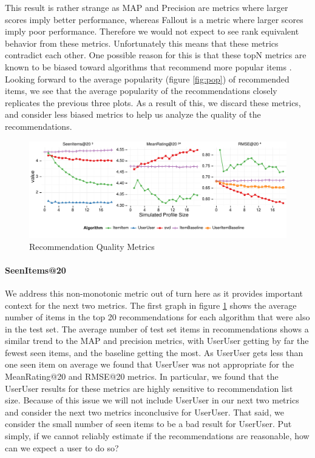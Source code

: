 \documentclass[letterpaper]{sig-alternate}
\begin{document}
  This result is rather strange as MAP and Precision are metrics where larger scores imply better performance, whereas Fallout is a metric where larger scores imply poor performance.
  Therefore we would not expect to see rank equivalent behavior from these metrics.
  Unfortunately this means that these metrics contradict each other.
  One possible reason for this is that these topN metrics are known to be biased toward algorithms that recommend more popular items \cite{bellogin}.
  Looking forward to the average popularity (figure \ref{fig:pop}) of recommended items, we see that the average popularity of the recommendations closely replicates the previous three plots.
  As a result of this, we discard these metrics, and consider less biased metrics to help us analyze the quality of the recommendations.


\begin{figure}[ht!]
  \centering
  \includegraphics[width=\linewidth]{../lenskit/output/ekstrandTuned20/rmse_20.pdf}
  \caption{Recommendation Quality Metrics}
  \label{fig:topN.rmse}
\end{figure}

  \paragraph{SeenItems@20}
  We address this non-monotonic metric out of turn here as it provides important context for the next two metrics.
  The first graph in figure \ref{fig:topN.rmse} shows the average number of items in the top 20 recommendations for each algorithm that were also in the test set.
  The average number of test set items in recommendations shows a similar trend to the MAP and precision metrics, with UserUser getting by far the fewest seen items, and the baseline getting the most.
  As UserUser gets less than one seen item on average we found that UserUser was not appropriate for the MeanRating@20 and RMSE@20 metrics.
  In particular, we found that the UserUser results for these metrics are highly sensitive to recommendation list size.
  Because of this issue we will not include UserUser in our next two metrics and consider the next two metrics inconclusive for UserUser.
  That said, we consider the small number of seen items to be a bad result for UserUser.
  Put simply, if we cannot reliably estimate if the recommendations are reasonable, how can we expect a user to do so?
\end{document}
